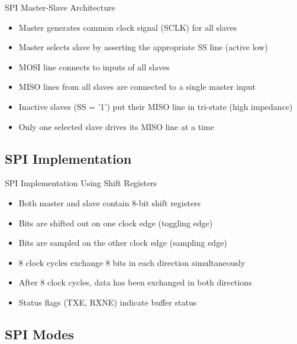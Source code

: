 \begin{concept}{SPI Master-Slave Architecture}
\begin{itemize}
    \item Master generates common clock signal (SCLK) for all slaves
    \item Master selects slave by asserting the appropriate SS line (active low)
    \item MOSI line connects to inputs of all slaves
    \item MISO lines from all slaves are connected to a single master input
    \item Inactive slaves (SS = '1') put their MISO line in tri-state (high impedance)
    \item Only one selected slave drives its MISO line at a time
\end{itemize}
\end{concept}

\subsection{SPI Implementation}

\begin{concept}{SPI Implementation Using Shift Registers}
\begin{itemize}
    \item Both master and slave contain 8-bit shift registers
    \item Bits are shifted out on one clock edge (toggling edge)
    \item Bits are sampled on the other clock edge (sampling edge)
    \item 8 clock cycles exchange 8 bits in each direction simultaneously
    \item After 8 clock cycles, data has been exchanged in both directions
    \item Status flags (TXE, RXNE) indicate buffer status
\end{itemize}
\end{concept}

\subsection{SPI Modes}


